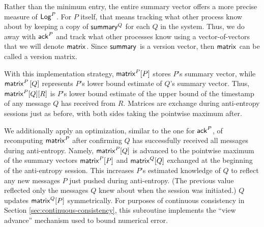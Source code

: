 \documentclass[]             %
{NASA}                       %
\theoremstyle{definition}
\begin{document}
Rather than the minimum entry, the entire summary vector offers a more
precise measure of $\mathsf{Log}^{P}$. For $P$ itself, that means tracking what
other process know about by keeping a copy of $\mathsf{summary}^{Q}$ for
each $Q$ in the system. Thus, we do away with $\mathsf{ack}^{P}$ and track
what other processes know using a vector-of-vectors that we will denote $\mathsf{matrix}^{}$. Since $\mathsf{summary}^{}$ is a version
vector, then $\mathsf{matrix}^{}$ can be called a version matrix.

With this implementation strategy, $\mathsf{matrix}^{P}[P]$ stores $P$'s
summary vector, while $\mathsf{matrix}^{P}\left[Q\right]$ represents $P$'s
lower bound estimate of $Q$'s summary vector. Thus,
$\mathsf{matrix}^{P}[Q][R]$ is $P$'s lower bound estimate of the upper bound
of the timestamp of any message $Q$ has received from $R$. Matrices
are exchange during anti-entropy sessions just as before, with both
sides taking the pointwise maximum after.

We additionally apply an optimization, similar to the one for
$\mathsf{ack}^{P}$, of recomputing $\mathsf{matrix}^{P}$ after confirming $Q$ has
successfully received all messages during anti-entropy. Namely,
$\mathsf{matrix}^{P}[Q]$ is advanced to the pointwise maximum of the summary
vectors $\mathsf{matrix}^{P}[P]$ and $\mathsf{matrix}^{Q}[Q]$ exchanged at the
beginning of the anti-entropy session. This increases $P$'s estimated
knowledge of $Q$ to reflect any new messages $P$ just pushed during
anti-entropy. (The previous value reflected only the messages $Q$ knew
about when the session was initiated.) $Q$ updates $\mathsf{matrix}^{Q}[P]$
symmetrically. For purposes of continuous consistency in Section
\ref{sec:continuous-consistency}, this subroutine implements the
``view advance'' mechanism used to bound numerical error.
\end{document}
